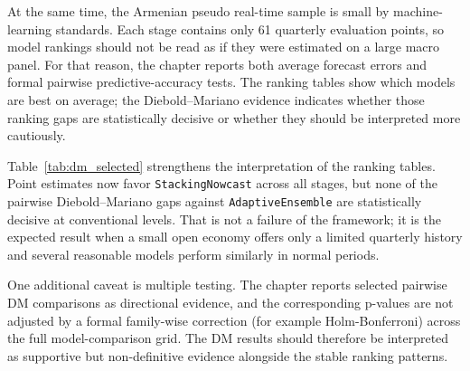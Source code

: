 \documentclass[12pt,a4paper]{report}
\begin{document}
At the same time, the Armenian pseudo real-time sample is small by machine-learning standards. Each stage contains only 61 quarterly evaluation points, so model rankings should not be read as if they were estimated on a large macro panel. For that reason, the chapter reports both average forecast errors and formal pairwise predictive-accuracy tests. The ranking tables show which models are best on average; the Diebold--Mariano evidence indicates whether those ranking gaps are statistically decisive or whether they should be interpreted more cautiously.

\begin{table}[H]
    \centering
    \small
    \caption{Selected Diebold--Mariano tests for the stage winners using one-step-ahead squared-error loss. Small p-values provide stronger evidence for the listed winner.}
    \label{tab:dm_selected}
\end{table}

Table~\ref{tab:dm_selected} strengthens the interpretation of the ranking tables. Point estimates now favor \texttt{StackingNowcast} across all stages, but none of the pairwise Diebold--Mariano gaps against \texttt{AdaptiveEnsemble} are statistically decisive at conventional levels. That is not a failure of the framework; it is the expected result when a small open economy offers only a limited quarterly history and several reasonable models perform similarly in normal periods.

One additional caveat is multiple testing. The chapter reports selected pairwise DM comparisons as directional evidence, and the corresponding p-values are not adjusted by a formal family-wise correction (for example Holm-Bonferroni) across the full model-comparison grid. The DM results should therefore be interpreted as supportive but non-definitive evidence alongside the stable ranking patterns.
\end{document}
